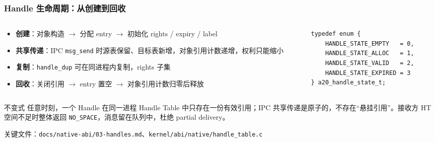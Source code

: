 \documentclass[aspectratio=1610]{beamer}
\newcommand{\code}[1]{\texttt{\footnotesize #1}}
\begin{document}
\begin{frame}[fragile]
    \frametitle{Handle 生命周期：从创建到回收}
    \begin{columns}
        \begin{column}{0.52\textwidth}
            \footnotesize
            \begin{itemize}
                \item \textbf{创建}：对象构造 $\rightarrow$ 分配 entry $\rightarrow$ 初始化 rights / expiry / label
                \item \textbf{共享传递}：IPC \code{msg\_send} 时源表保留、目标表新增，对象引用计数递增，权利只能缩小
                \item \textbf{复制}：\code{handle\_dup} 可在同进程内复制，rights 子集
                \item \textbf{回收}：关闭引用 $\rightarrow$ entry 置空 $\rightarrow$ 对象引用计数归零后释放
            \end{itemize}
        \end{column}
        \begin{column}{0.45\textwidth}
            \begin{lstlisting}[basicstyle=\ttfamily\tiny]
typedef enum {
    HANDLE_STATE_EMPTY   = 0,
    HANDLE_STATE_ALLOC   = 1,
    HANDLE_STATE_VALID   = 2,
    HANDLE_STATE_EXPIRED = 3
} a20_handle_state_t;
            \end{lstlisting}
        \end{column}
    \end{columns}
    \vspace{0.3em}
    \begin{block}{不变式}
        \footnotesize
        任意时刻，一个 Handle 在同一进程 Handle Table 中只存在一份有效引用；IPC 共享传递是原子的，不存在“悬挂引用”。接收方 HT 空间不足时整体返回 \code{NO\_SPACE}，消息留在队列中，杜绝 partial delivery。
    \end{block}
    \small 关键文件：\code{docs/native-abi/03-handles.md}、\code{kernel/abi/native/handle\_table.c}
\end{frame}
\end{document}
